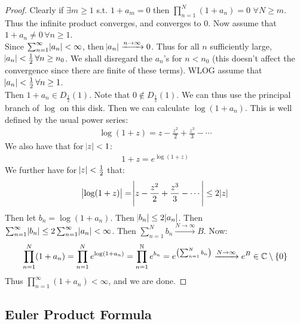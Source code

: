 \begin{proof}
Clearly if $\exists m \geq 1 $ s.t. $1+a_m = 0$ then $\prod_{n=1}^N(1+a_n) = 0 \, \, \forall N\geq m$. Thus the infinite product converges, and converges to $0$. Now assume that $1+a_n \neq 0 \, \forall n \geq 1$.\\

Since $\sum_{n=1}^\infty \abs{a_n} < \infty$, then $\abs{a_n} \xrightarrow[]{n\to \infty } 0$. Thus for all $n$ sufficiently large, $\abs{a_n} < \frac{1}{2}\, \forall n \geq n_0$. We shall disregard the $a_n$'s for $n < n_0$ (this doesn't affect the convergence since there are finite of these terms). WLOG assume that $\abs{a_n} < \frac{1}{2} \, \forall n \geq 1$.\\

Then $1+a_n \in D_\frac{1}{2}(1)$. Note that $0 \not\in D_\frac{1}{2}(1)$. We can thus use the principal branch of $\log$ on this disk. Then we can calculate $\log(1+a_n)$. This is well defined by the usual power series:
\begin{align*}
    \log(1+z) = z - \frac{z^2}{2} + \frac{z^3}{3} - \cdots
\end{align*}
We also have that for $\abs{z}< 1$:
\begin{align*}
    1+z = e^{\log(1+z)}
\end{align*}
We further have for $\abs{z} < \frac{1}{2}$ that:
\begin{align*}
    \abs{\log(1+z)} = \abs{z - \frac{z^2}{2} + \frac{z^3}{3} - \cdots} \leq  2 \abs{z}
\end{align*}
Then let $b_n = \log(1+a_n)$. Then $\abs{b_n} \leq 2 \abs{a_n}$. Then $\sum_{n=1}^\infty \abs{b_n} \leq 2 \sum_{n=1}^\infty \abs{a_n} < \infty$. Then $\sum_{n=1}^N b_n \xrightarrow[]{N \to \infty} B$. Now:
\begin{align*}
    \prod_{n=1}^N (1+a_n) = \prod_{n=1}^N e^{\log(1+a_n)} = \prod_{n=1}^{\mathbb{N}} e^{b_n} = e^{ \left( \sum_{n=1}^N b_n \right)} \xrightarrow{N \to \infty} e^B \in \mathbb{C} \setminus \{0 \}
\end{align*}
Thus $\prod_{n=1}^\infty (1+a_n) < \infty$, and we are done.



\end{proof}

\subsection{Euler Product Formula}

